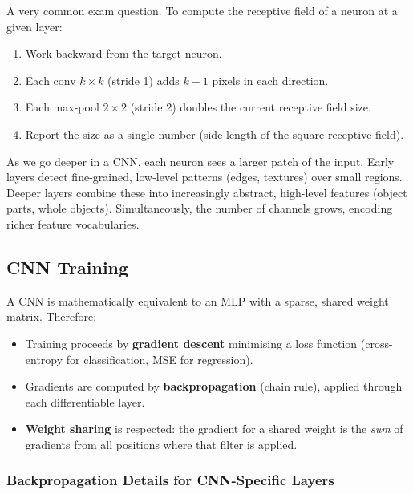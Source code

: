 \documentclass[11pt,a4paper]{article}
\begin{document}
\begin{warnbox}
A very common exam question. To compute the receptive field of a neuron at a given layer:
\begin{enumerate}
  \item Work backward from the target neuron.
  \item Each conv $k\times k$ (stride 1) adds $k-1$ pixels in each direction.
  \item Each max-pool $2\times2$ (stride 2) doubles the current receptive field size.
  \item Report the size as a single number (side length of the square receptive field).
\end{enumerate}
\end{warnbox}

\begin{insightbox}[Deeper = wider receptive field = higher-level features]
As we go deeper in a CNN, each neuron sees a larger patch of the input. Early layers detect fine-grained, low-level patterns (edges, textures) over small regions. Deeper layers combine these into increasingly abstract, high-level features (object parts, whole objects). Simultaneously, the number of channels grows, encoding richer feature vocabularies.
\end{insightbox}

\subsection{CNN Training}

A CNN is mathematically equivalent to an MLP with a sparse, shared weight matrix. Therefore:
\begin{itemize}
  \item Training proceeds by \textbf{gradient descent} minimising a loss function (cross-entropy for classification, MSE for regression).
  \item Gradients are computed by \textbf{backpropagation} (chain rule), applied through each differentiable layer.
  \item \textbf{Weight sharing} is respected: the gradient for a shared weight is the \emph{sum} of gradients from all positions where that filter is applied.
\end{itemize}

\subsubsection{Backpropagation Details for CNN-Specific Layers}
\end{document}
